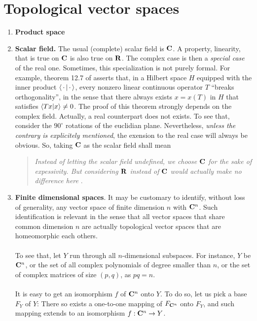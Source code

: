 \section*{Topological vector spaces}
\begin{enumerate}
\item{{\bf Product space}}
\item {\bf Scalar field.} The usual (complete) scalar field is ${\mathbf C}$. %
A property, \eg linearity, that is true on ${\mathbf C}$ is also true on ${\mathbf R}$. %
The complex case is then a {\it special case} of the real one. %
Sometimes, this specialization is not purely formal. %
For example, theorem 12.7 of \cite{FA} asserts that, in a Hilbert space $H$ %
equipped with the inner product $\bra{\,\cdot\,}\ket{\,\cdot\,}$, %
every nonzero linear continuous operator $T$ ``breaks orthogonality'', %
in the sense that there always exists $x=x(T)$ in $H$ that satisfies %
%
  $\bra{Tx}\ket{x} \neq 0$. %
%
The proof of this theorem strongly depends on the complex field. %
Actually, a real counterpart does not exists. %
To see that, consider the $90^\circ$ rotations of the euclidian plane. %
%
Nevertheless, {\it unless the contrary is explicitely mentioned}, %
the exension to the real case will always be obvious. %
So, taking ${\mathbf C}$ as the scalar field shall mean %
%
\begin{quote}{\it %
Instead of letting the scalar field undefined, we choose ${\mathbf C}$ for the sake of %
expessivity. But considering ${\mathbf R}$ instead of %
${\mathbf C}$ would actually make no difference here
}. %
\end{quote}
%
\item {\bf Finite dimensional spaces}. %
It may be customary to identify, without loss of generality, %
any vector space of finite dimension $n$ with ${\mathbf C}^n$. %
%
Such identification is relevant in the sense that all vector spaces that %
share common dimension $n$ are actually topological vector spaces that are %
homeomorphic each others. \\
\\
To see that, let $\mathit{Y}$ run through all $n$-dimensional subspaces. 
For instance, $Y$ be ${\mathbf C}^n$, %
or the set of all complex %
polynomials of degree smaller than $n$, %
or the set of complex matrices of size $(p,q)$, as $pq=n$. \\
\\
It is easy to get an isomorphism $f$ of ${\mathbf C}^n$ onto $Y$. %
To do so, let us pick a base $F_Y$ of $Y$: %
There so exists a one-to-one mapping of $F_{{\mathbf C}^n}$ onto $ F_Y$, %
and such mapping extends to an isomorphism $f: {\mathbf C}^n \to Y$. %

\end{enumerate}
